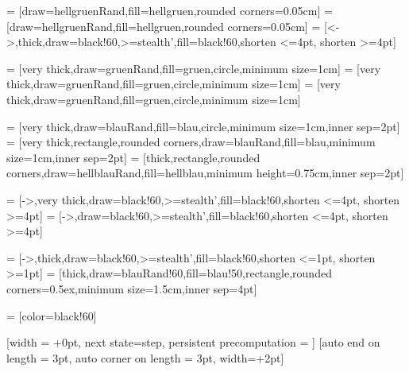  = [draw=hellgruenRand,fill=hellgruen,rounded corners=0.05cm]
 = [draw=hellgruenRand,fill=hellgruen,rounded corners=0.05cm]
 = [<->,thick,draw=black!60,>=stealth',fill=black!60,shorten <=4pt, shorten >=4pt]

 = [very thick,draw=gruenRand,fill=gruen,circle,minimum size=1cm]
 = [very thick,draw=gruenRand,fill=gruen,circle,minimum size=1cm]
 = [very thick,draw=gruenRand,fill=gruen,circle,minimum size=1cm]

 = [very thick,draw=blauRand,fill=blau,circle,minimum size=1cm,inner sep=2pt]
 = [very thick,rectangle,rounded corners,draw=blauRand,fill=blau,minimum size=1cm,inner sep=2pt]
 = [thick,rectangle,rounded corners,draw=hellblauRand,fill=hellblau,minimum height=0.75cm,inner sep=2pt]

 = [->,very thick,draw=black!60,>=stealth',fill=black!60,shorten <=4pt, shorten >=4pt]
 = [->,draw=black!60,>=stealth',fill=black!60,shorten <=4pt, shorten >=4pt]

 = [->,thick,draw=black!60,>=stealth',fill=black!60,shorten <=1pt, shorten >=1pt]
 = [thick,draw=blauRand!60,fill=blau!50,rectangle,rounded corners=0.5ex,minimum size=1.5cm,inner sep=4pt]

 = [color=black!60]


\def\processor#1{
  \begin{scope}[shift={#1},scale=0.75]
    \fill[fill=blau] (-0.9,0) -- (-1.1,0.2) -- (-1.1,1) -- (1.1,1) -- (1.1,0.2) -- (1.3,0) -- (1.1,-0.2) -- (1.1,-1) -- (-1.1,-1) -- (-1.1,-0.2) -- (-0.9,0);
    \draw[draw=blauRand, very thick] (-0.9,0) -- (-1.1,0.2) -- (-1.1,1) -- (1.1,1) -- (1.1,0.2) -- (1.3,0) -- (1.1,-0.2) -- (1.1,-1) -- (-1.1,-1) -- (-1.1,-0.2) -- (-0.9,0);
  \end{scope}
}

{
  [width = +0pt,
                next state=step,
                persistent precomputation = \pgfdecoratepathhascornerstrue]{}
  [auto end on length    = 3pt,
               auto corner on length = 3pt,               
               width=+2pt]
  {
  }
  {}
}
\def\freedraw#1;{\draw[free hand] #1;} 
